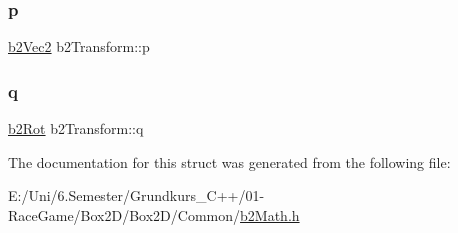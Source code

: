 \subsubsection{\texorpdfstring{p}{p}}
{\footnotesize\ttfamily \mbox{\hyperlink{structb2_vec2}{b2\+Vec2}} b2\+Transform\+::p}

\mbox{\label{structb2_transform_ae4aaac23f32686e165138c4e5dc4ce85}} 
\subsubsection{\texorpdfstring{q}{q}}
{\footnotesize\ttfamily \mbox{\hyperlink{structb2_rot}{b2\+Rot}} b2\+Transform\+::q}



The documentation for this struct was generated from the following file\+:\begin{DoxyCompactItemize}
\item 
E\+:/\+Uni/6.\+Semester/\+Grundkurs\+\_\+\+C++/01-\/\+Race\+Game/\+Box2\+D/\+Box2\+D/\+Common/\mbox{\hyperlink{b2_math_8h}{b2\+Math.\+h}}\end{DoxyCompactItemize}
